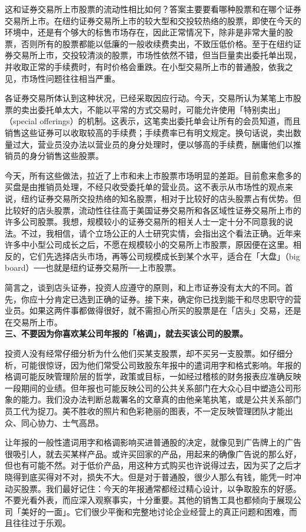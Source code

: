 \documentclass[UTF8,a4paper,zihao=-4,fontset = windows]{ctexart} %
\begin{document}
这和证券交易所上市股票的流动性相比如何？答案主要要看哪种股票和在哪个证券交易所上市。在纽约证券交易所上市的较大型和交投较热络的股票，即使在今天的环境中，还是有个够大的标售市场存在，因此正常情况下，除非是非常大量的股票，否则所有的股票都能以低廉的一般收续费卖出，不致压低价格。至于在纽约证券交易所上市，交投较清淡的股票，市场性依然不错，但当巨量卖出委托单出现，并收取正常的手续费时，有时价格会重跌。在小型交易所上市的普通股，依我之见，市场性问题往往相当严重。

各证券交易所体认到这种状况，已经采取因应行动。今天，交易所认为某笔上市股票的卖出委托单太大，不能以平常的方式交易时，可能允许使用「特别卖出」（special offerings）的机制。这表示，这笔卖出委托单会让所有的会员知道，而且销售这些证券可以收取较高的手续费；手续费率已有明文规定。换句话说，卖出数量过大，营业员没办法以营业员的身分处理时，便以够高的手续费，酬庸他们以推销员的身分销售这些股票。

今天，所有这些做法，拉近了上市和未上市股票市场明显的差距。目前愈来愈多的买盘是由推销员处理，不经只收受委托单的营业员。这不表示从市场性的观点来说，纽约证券交易所交投热络的知名股票，相对于比较好的店头股票占有优势。但比较好的店头股票，流动性往往高于美国证券交易所和各区域性证券交易所上市的许多公司股票。我想，规模较小的证券交易所的相关人士一定十分不同意我的说法。不过，我相信，请个立场公正的人士研究实情，会指出这个看法正确。近年来许多中小型公司成长之后，不愿在规模较小的交易所上市股票，原因便在这里。相反的，它们先选择店头市场，再等公司规模成长到某个水平，适合在「大盘」（big board）──也就是纽约证券交易所──上市股票。

简言之，谈到店头证券，投资人应遵守的原则，和上市证券没有太大的不同。首先，你应十分肯定已选到正确的证券。接下来，确定你已找到能干和尽忠职守的营业员。如果这两件事都做得很好，就不需担心所买的股票是在「店头」交易，还是在交易所上市。
\\

\textbf{三、不要因为你喜欢某公司年报的「格调」，就去买该公司的股票。}


投资人没有经常仔细分析为什么他们买某支股票，却不买另一支股票。如仔细分析，可能很惊讶，因为他们常受公司致股东年报中的遣词用字和格式影响。年报的格调可能反映管理阶层的哲学，政策或目标，一如经过稽核的财务报表应准确反映一段期间的业绩。但年报也可能反映公司的公共关系部门在大众心目中塑造公司形象的能力。我们没办法判断总裁署名的文章真的由他亲笔执笔，或是公共关系部门员工代为捉刀。美不胜收的照片和色彩艳丽的图表，不一定反映管理团队才能出众、同心协力、士气高昂。

让年报的一般性遣词用字和格调影响买进普通股的决定，就像见到广告牌上的广告很吸引人，就去买某样产品。或许买回家的产品，用起来的确像广告说的那么好，但也有可能不然。对于低价产品，用这种方式购买也许说得过去，因为买了之后才晓得到底买得对不对，损失不大。但是对于普通股，很少人那么有钱，能凭一时冲动买股票。我们最好记住：今天的年报通常都经过精心设计，以争取股东的好感。不要光看外表，而应深入观察事实，十分重要。其他的销售工具也都倾向于展现公司「美好的一面」。它们很少平衡和完整地讨论企业经营上的真正问题和困难，而且往往过于乐观。
\end{document}
